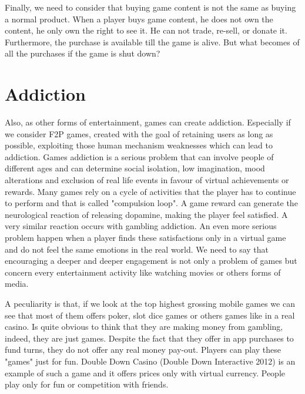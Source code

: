 Finally, we need to consider that buying game content is not the same as buying a normal product. When a player buys game content, he does not own the content, he only own the right to see it. He can not trade, re-sell, or donate it. Furthermore, the purchase is available till the game is alive. But what becomes of all the purchases if the game is shut down?  

\section{Addiction}
Also, as other forms of entertainment, games can create addiction. Especially if we consider F2P games, created with the goal of retaining users as long as possible, exploiting those human mechanism weaknesses which can lead to addiction. Games addiction is a serious problem that can involve people of different ages and can determine social isolation, low imagination, mood alterations and exclusion of real life events in favour of virtual achievements or rewards. Many games rely on a cycle of activities that the player has to continue to perform and that is called "compulsion loop". A game reward can generate the neurological reaction of releasing dopamine, making the player feel satisfied. A very similar reaction occurs with gambling addiction. An even more serious problem happen when a player finds these satisfactions only in a virtual game and do not feel the same emotions in the real world. We need to say that encouraging a deeper and deeper engagement is not only a problem of games but concern every entertainment activity like watching movies or others forms of media.

A peculiarity is that, if we look at the top highest grossing mobile games we can see that most of them offers poker, slot dice games or others games like in a real casino. Is quite obvious to think that they are making money from gambling, indeed, they are just games. Despite the fact that they offer in app purchases to fund turns, they do not offer any real money pay-out. Players can play these "games" just for fun. Double Down Casino (Double Down Interactive 2012) is an example of such a game and it offers prices only with virtual currency. People play only for fun or competition with friends. 

